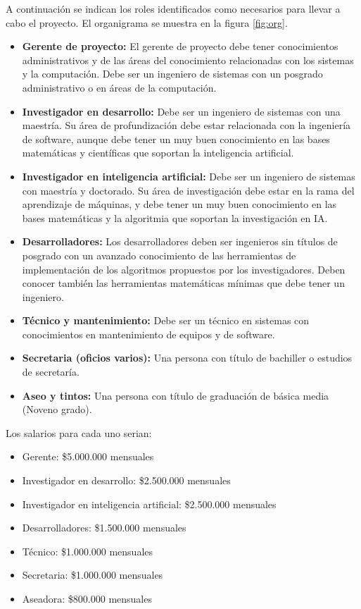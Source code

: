 \documentclass[a4paper, 12pt, oneside]{article}
\begin{document}
	A continuación se indican los roles identificados como necesarios para llevar a cabo el proyecto. El organigrama se muestra en la figura \ref{fig:org}.

	\begin{itemize}

		\item {\bf Gerente de proyecto:} El gerente de proyecto debe tener conocimientos administrativos y de las áreas del conocimiento relacionadas con los sistemas y la computación. Debe ser un ingeniero de sistemas con un posgrado administrativo o en áreas de la computación.

		\item {\bf Investigador en desarrollo:} Debe ser un ingeniero de sistemas con una maestría. Su área de profundización debe estar relacionada con la ingeniería de software, aunque debe tener un muy buen conocimiento en las bases matemáticas y científicas que soportan la inteligencia artificial.

		\item {\bf Investigador en inteligencia artificial:} Debe ser un ingeniero de sistemas con maestría y doctorado. Su área de investigación debe estar en la rama del aprendizaje de máquinas, y debe tener un muy buen conocimiento en las bases matemáticas y la algoritmia que soportan la investigación en IA.

		\item {\bf Desarrolladores:} Los desarrolladores deben ser ingenieros sin títulos de posgrado con un avanzado conocimiento de las herramientas de implementación de los algoritmos propuestos por los investigadores. Deben conocer también las herramientas matemáticas mínimas que debe tener un ingeniero.

		\item {\bf Técnico y mantenimiento:} Debe ser un técnico en sistemas con conocimientos en mantenimiento de equipos y de software.

		\item {\bf Secretaria (oficios varios):} Una persona con título de bachiller o estudios de secretaría.
		
		\item {\bf Aseo y tintos:} Una persona con título de graduación de básica media (Noveno grado).

	\end{itemize}	
	
	Los salarios para cada uno serian:
	\label{sec:salarios}

\begin{itemize}
	\item Gerente: \$5.000.000 mensuales
	\item Investigador en desarrollo: \$2.500.000 mensuales
	\item Investigador en inteligencia artificial: \$2.500.000 mensuales
	\item Desarrolladores: \$1.500.000 mensuales
	\item Técnico: \$1.000.000 mensuales
	\item Secretaria: \$1.000.000 mensuales
	\item Aseadora: \$800.000 mensuales
\end{itemize}
\end{document}
